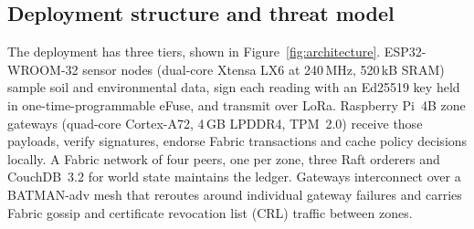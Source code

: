\documentclass[a4paper,fleqn]{cas-sc}
\begin{document}
\subsection{Deployment structure and threat model}
\label{subsec:threat}

The deployment has three tiers, shown in Figure~\ref{fig:architecture}.
ESP32-WROOM-32 sensor nodes (dual-core Xtensa LX6 at 240\,MHz, 520\,kB SRAM)
sample soil and environmental data, sign each reading with an Ed25519 key
held in one-time-programmable eFuse, and transmit over LoRa. Raspberry Pi~4B
zone gateways (quad-core Cortex-A72, 4\,GB LPDDR4, TPM~2.0) receive those
payloads, verify signatures, endorse Fabric transactions and cache policy
decisions locally. A Fabric network of four peers, one per zone, three Raft
orderers and CouchDB~3.2 for world state maintains the ledger. Gateways
interconnect over a BATMAN-adv mesh \cite{batman2010} that reroutes around
individual gateway failures and carries Fabric gossip and certificate
revocation list (CRL) traffic between zones.
\end{document}
